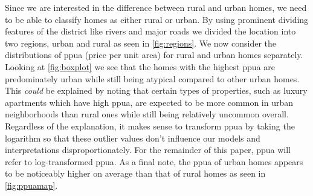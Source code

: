 Since we are interested in the difference between rural and urban homes, we need to be able to classify homes as either rural or
urban. By using prominent dividing features of the district like rivers and major roads we divided the location into two regions,
urban and rural as seen in \cref{fig:regions}. We now consider the distributions of ppua (price per unit area) for rural and urban
homes separately. Looking at \cref{fig:boxplot} we see that the homes with the highest ppua are predominately urban while still
being atypical compared to other urban homes. This \textit{could} be explained by noting that certain types of properties, such as
luxury apartments which have high ppua, are expected to be more common in urban neighborhoods than rural ones while still being
relatively uncommon overall. Regardless of the explanation, it makes sense to transform ppua by taking the logarithm so that these
outlier values don't influence our models and interpretations disproportionately. For the remainder of this paper, ppua will refer
to log-transformed ppua. As a final note, the ppua of urban homes appears to be noticeably higher on average than that of rural
homes as seen in \cref{fig:ppuamap}.
